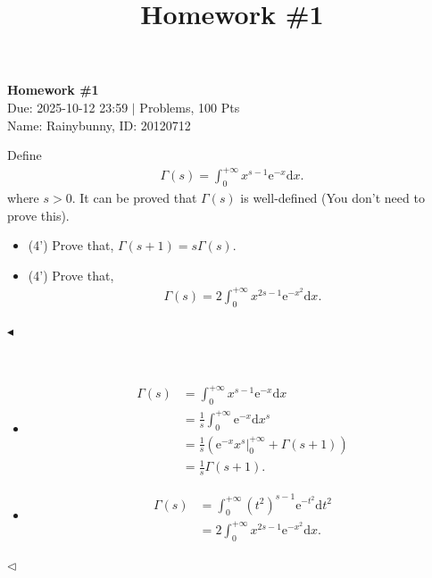 ﻿\documentclass[11pt]{article}
\title{Homework \#1}
\newenvironment{problem}[2][Problem]{\begin{trivlist}
\item[\hskip \labelsep {\bfseries #1}\hskip \labelsep {\bfseries #2.}]}{\hfill$\blacktriangleleft$\end{trivlist}}
\newenvironment{answer}[1][Answer]{\begin{trivlist}
\item[\hskip \labelsep {\bfseries #1.}\hskip \labelsep]}{\hfill$\lhd$\end{trivlist}}
\begin{document}
\pagestyle{fancy}
\chead{}

\begin{center}
    {\LARGE \bf Homework \#1}\\
    {Due: 2025-10-12 23:59 \quad$|$ Problems, 100 Pts}\\
    {Name: Rainybunny, ID: 20120712}            %
\end{center}



\begin{problem}{1 (8')}
Define
\begin{align*}
    \Gamma(s) = \int_{0}^{+\infty} x^{s - 1} \mathrm{e}^{-x} \mathrm{d}x.
\end{align*}
where $s>0$. It can be proved that $\Gamma(s)$ is well-defined (You don't need to prove this).
\begin{itemize}
    \item [(1)] (4') Prove that, $\Gamma(s+1)=s\Gamma(s)$.
    \item [(2)] (4') Prove that,
    \begin{align*}
        \Gamma(s)=2\int_{0}^{+\infty}x^{2s-1}\mathrm{e}^{-x^2}\mathrm{d}x.
    \end{align*}
\end{itemize}
\end{problem}

\begin{answer} ~
\begin{itemize}
    \item [(1)]
        $$
            \begin{aligned}
                \Gamma(s) &= \int_{0}^{+\infty} x^{s-1}\mathrm{e}^{-x}\mathrm{d}x\\
                &= \frac{1}{s}\int_{0}^{+\infty} \mathrm{e}^{-x}\mathrm{d}x^s\\
                &= \frac{1}{s}\left(\left.\mathrm{e}^{-x}x^s\right|_0^{+\infty} + \Gamma(s + 1)\right)\\
                &= \frac{1}{s}\Gamma(s + 1).
            \end{aligned}
        $$
    \item [(2)]
        $$
            \begin{aligned}
                \Gamma(s) &= \int_{0}^{+\infty} (t^2)^{s-1} \mathrm{e}^{-t^2}\mathrm{d} t^2\\
                &= 2\int_{0}^{+\infty} x^{2s-1} \mathrm{e}^{-x^2} \mathrm{d}x.
            \end{aligned}
        $$
\end{itemize}
\end{answer}
\end{document}
